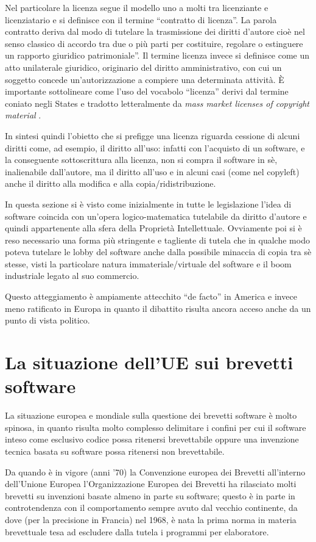 Nel particolare la licenza segue il modello uno a molti tra licenziante e licenziatario e si definisce con il termine ``contratto di licenza''. La parola contratto deriva dal modo di tutelare la trasmissione dei diritti d'autore cioè nel senso classico di accordo  tra due o più parti per costituire, regolare o estinguere un rapporto giuridico patrimoniale”.
Il termine licenza invece si definisce come un atto unilaterale giuridico, originario del diritto amministrativo, con cui un soggetto concede un'autorizzazione a compiere una determinata attività. \`E importante sottolineare come l'uso del vocabolo ``licenza'' derivi dal termine coniato negli States e tradotto letteralmente da \textit{mass market licenses of copyright material }.

In sintesi quindi l'obietto che si prefigge una licenza riguarda cessione di alcuni diritti come, ad esempio, il diritto all'uso: infatti con l'acquisto di un software, e la conseguente sottoscrittura alla licenza, non si compra il software in sè, inalienabile dall'autore, ma il diritto all'uso e in alcuni casi (come nel copyleft) anche il diritto alla modifica e alla copia/ridistribuzione.

In questa sezione si è visto come inizialmente in tutte le legislazione l'idea di software coincida con un'opera logico-matematica tutelabile da diritto d'autore e quindi appartenente alla sfera della Proprietà Intellettuale. Ovviamente poi si è reso necessario una forma più stringente e tagliente di tutela che in qualche modo poteva tutelare le lobby del software anche dalla possibile minaccia di copia tra sè stesse, visti la particolare natura immateriale/virtuale del software e il boom industriale legato al suo commercio.

Questo atteggiamento è ampiamente attecchito ``de facto'' in America e invece meno ratificato in Europa in quanto il dibattito risulta ancora acceso anche da un punto di vista politico.

\section{La situazione dell'UE sui brevetti software}
La situazione europea e mondiale sulla questione dei brevetti software è molto spinosa, in quanto risulta molto complesso delimitare i confini per cui il software inteso come esclusivo codice possa ritenersi brevettabile oppure una invenzione tecnica basata su software possa ritenersi non brevettabile.

Da quando è in vigore (anni '70) la Convenzione europea dei Brevetti all'interno dell'Unione Europea l'Organizzazione Europea dei Brevetti ha rilasciato molti brevetti su invenzioni basate almeno in parte su software; questo è in parte in controtendenza con il comportamento sempre avuto dal vecchio continente, da dove (per la precisione in Francia) nel 1968\cite{invenzione-software}, è nata la prima norma in materia brevettuale tesa ad escludere dalla tutela i programmi per elaboratore.

